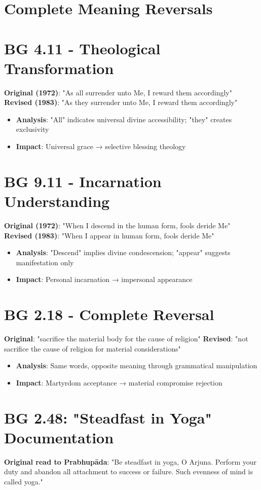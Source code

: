\documentclass[11pt,twoside]{book}
\begin{document}
\section*{Complete Meaning Reversals}
\label{sec:org289c9e9}

\section*{BG 4.11 - Theological Transformation}
\label{sec:org96d2f9a}
\textbf{\textbf{Original (1972)}}: "As all surrender unto Me, I reward them accordingly"
\textbf{\textbf{Revised (1983)}}: "As they surrender unto Me, I reward them accordingly"
\begin{itemize}
\item \textbf{\textbf{Analysis}}: "All" indicates universal divine accessibility; "they" creates exclusivity
\item \textbf{\textbf{Impact}}: Universal grace → selective blessing theology
\end{itemize}
\section*{BG 9.11 - Incarnation Understanding}
\label{sec:orgc8cee2f}
\textbf{\textbf{Original (1972)}}: "When I descend in the human form, fools deride Me"
\textbf{\textbf{Revised (1983)}}: "When I appear in human form, fools deride Me"
\begin{itemize}
\item \textbf{\textbf{Analysis}}: "Descend" implies divine condescension; "appear" suggests manifestation only
\item \textbf{\textbf{Impact}}: Personal incarnation → impersonal appearance
\end{itemize}
\section*{BG 2.18 - Complete Reversal}
\label{sec:org1323963}
\textbf{\textbf{Original}}: "sacrifice the material body for the cause of religion" 
\textbf{\textbf{Revised}}: "not sacrifice the cause of religion for material considerations"
\begin{itemize}
\item \textbf{\textbf{Analysis}}: Same words, opposite meaning through grammatical manipulation
\item \textbf{\textbf{Impact}}: Martyrdom acceptance → material compromise rejection
\end{itemize}
\section*{BG 2.48: "Steadfast in Yoga" Documentation}
\label{sec:org1ffbca0}
\textbf{\textbf{Original read to Prabhupāda}}: "Be steadfast in yoga, O Arjuna. Perform your duty and abandon all attachment to success or failure. Such evenness of mind is called yoga."
\end{document}
